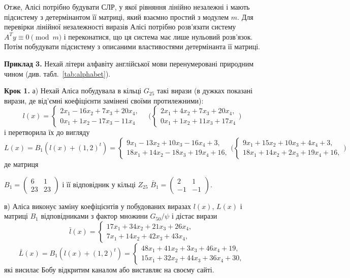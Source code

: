 \documentclass{ceurart}
\begin{document}
Отже, Алісі потрібно будувати СЛР, у якої рівняння лінійно незалежні
і мають підсистему з детермінантом її матриці, який взаємно простий з
модулем \(m\). Для перевірки лінійної незалежності виразів Алісі потрібно
розв'язати систему \(A^Ty\equiv 0 \pmod{m}\) і переконатися, що
ця система має лише нульовий розв'язок. Потім побудувати
підсистему з описаними властивостями детермінанта її матриці.

{\footnotesize %
\textbf{Приклад 3.} Нехай літери алфавіту англійської мови перенумеровані
природним чином (див. табл.~\ref{tab:alphabet}).

\textbf{Крок 1.} а) Нехай Аліса побудувала в кільці \(G_{25}\) такі вирази
(в дужках показані вирази, де від'ємні коефіцієнти замінені своїми
протилежними):
\[
l(x)= \begin{cases}
  2x_1 -16x_2 +  7x_3 + 20x_4,\\
  0x_1 + 1x_2 - 17x_3 - 11x_4
\end{cases}
\quad \Biggl ( \begin{cases}
  2x_1 + 4x_2 +  7x_3 + 20x_4,\\
  0x_1 + 1x_2 + 11x_3 + 17x_4
\end{cases} \Biggr )
\]
і перетворила їх до вигляду
\[
L(x)= B_1(l(x)+ (1,2)^t) =
\begin{cases}
  9x_1 - 13x_2 + 10x_3 - 16x_4 + 3,\\
 18x_1 + 14x_2 - 18x_3 + 19x_4 +16,
\end{cases}
\Biggl (
\begin{cases}
  9x_1 + 15x_2 + 10x_3 + 4x_4 + 3,\\
 18x_1 + 14x_2 + 2x_3 + 19x_4 +16,
\end{cases}
\Biggr )
\]
де матриця
\begin{center} %
\(
B_1= \begin{pmatrix}
   6 & 1\\
   23 & 23
\end{pmatrix}
\)
\quad і її відповідник у кільці \(Z_{25}\) \quad
\(
\bar B_1 = \begin{pmatrix}
   2 & 1\\
  -1 & -1
\end{pmatrix}.
\)
\end{center}

в) Аліса виконує заміну коефіцієнтів у побудованих
виразах \(l(x)\), \(L(x)\) і матриці \(B_1\) відповідниками з фактор
множини \(G_{50}/\psi\) і дістає вирази
\[
\bar l(x)= \begin{cases}
  17x_1 + 34x_2 +  21x_3 + 26x_4,\\
   7x_1 + 14x_2 +  42x_3 + 43x_4,
\end{cases}
\]
\[\bar L(x)= B_1(l(x)+ (1,2)^t) = \begin{cases}
  48x_1 + 41x_2 + 3x_3 + 46x_4 + 19,\\
 15x_1 + 32x_2 + 44x_3 + 36x_4 + 30,
\end{cases}
\]
які висилає Бобу відкритим каналом або виставляє на своєму сайті.

}
\end{document}
